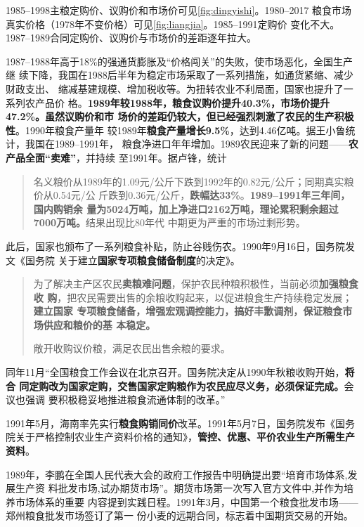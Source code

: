 



1985--1998主粮定购价、议购价和市场价可见\cref{fig:dingyishi}。1980--2017
粮食市场真实价格（1978年不变价格）可见\cref{fig:liangjia}。1985--1991定购价
变化不大。1987--1989合同定购价、议购价与市场价的差距逐年拉大。


1987--1988年高于18\%的强通货膨胀及“价格闯关”的失败，使市场恶化，全国生产继
续下降，我国在1988后半年为稳定市场采取了一系列措施，如通货紧缩、减少财政支出、
缩减基建规模、增加税收等。为扭转农业不利局面，国家也提升了一系列农产品价
格。\textbf{1989年较1988年，粮食议购价提升40.3\%，市场价提升47.2\%。虽然议购价和市
  场价的差距仍较大，但已经强烈刺激了农民的生产积极性}。1990年粮食产量年
较1989年\textbf{粮食产量增长9.5\%}，达到4.46亿吨。据王小鲁统计，我国在1989--1991年，
粮食净进口年年增加。1989农民迎来了新的问题——\textbf{农产品全面“卖难”}，并持续
至1991年。据卢锋，统计
\begin{quotation}
  名义粮价从1989年的1.09元/公斤下跌到1992年的0.82元/公斤；同期真实粮价从0.54元/公
  斤跌到0.36元/公斤，\textbf{跌幅达33\%}。\textbf{1989--1991年三年间，国内购销余
    量为5024万吨，加上净进口2162万吨，理论累积剩余超过7000万吨。}结果出现比80年代
  中期更为严重的市场过剩形势。
\end{quotation}

此后，国家也颁布了一系列粮食补贴，防止谷贱伤农。1990年9月16日，国务院发文《国务院
关于建立\textbf{国家专项粮食储备制度}的决定》。
\begin{quotation}
  为了解决主产区农民\textbf{卖粮难问题}，保护农民种粮积极性，当前必须\textbf{加强粮食收
    购}，把农民需要出售的余粮收购起来，以促进粮食生产持续稳定发展；\textbf{建立国家
    专项粮食储备，增强宏观调控能力，搞好丰歉调剂，保证粮食市场供应和粮价的基
    本稳定。}

  敞开收购议价粮，满足农民出售余粮的要求。
\end{quotation}

同年11月“全国粮食工作会议在北京召开。国务院决定从1990年秋粮收购开始，\textbf{将合
  同定购改为国家定购，交售国家定购粮作为农民应尽义务，必须保证完成。}会议也强调
要积极稳妥地推进粮食流通体制的改革。”

1991年5月，海南率先实行\textbf{粮食购销同价}改革。1991年5月7日，国务院发布《国务
院关于严格控制农业生产资料价格的通知》，\textbf{管控、优惠、平价农业生产所需生产
  资料}。

1989年，李鹏在全国人民代表大会的政府工作报告中明确提出要“培育市场体系,发展生产资
料批发市场,试办期货市场”。期货市场第一次写入官方文件中,并作为培养市场体系的重要
内容提到实践日程。1991年3月，中国第一个粮食批发市场——郑州粮食批发市场签订了第一
份小麦的远期合同，标志着中国期货交易的开始。\cite{taochangsheng}


